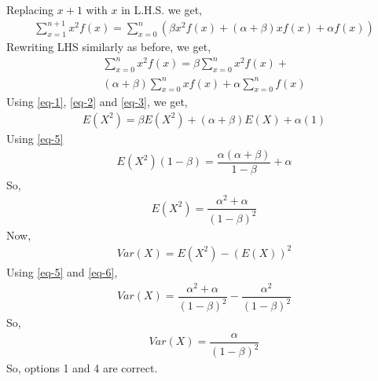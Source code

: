 \documentclass[journal,12pt,twocolumn]{IEEEtran}
\begin{document}
Replacing $x+1$ with $x$ in L.H.S. we get, 
\begin{align}
    \sum_{x=1}^{n+1}x^2f(x)=\sum_{x=0}^n(\beta x^2f(x) + (\alpha+\beta)xf(x) + \alpha f(x))
\end{align}
Rewriting LHS similarly as before, we get,
\begin{align}
    \sum_{x=0}^nx^2f(x)=\beta \sum_{x=0}^nx^2f(x) + \nonumber \\
    (\alpha + \beta)\sum_{x=0}^nxf(x) + \alpha \sum_{x=0}^nf(x)
\end{align}
Using \eqref{eq-1}, \eqref{eq-2} and \eqref{eq-3}, we get,
\begin{align}
    E(X^2)=\beta E(X^2) + (\alpha + \beta)E(X) + \alpha (1) 
\end{align}
Using \eqref{eq-5}
\begin{align}
    E(X^2)(1-\beta)=\dfrac{\alpha(\alpha+\beta)}{1-\beta} + \alpha
\end{align}
So,
\begin{align} \label{eq-6}
    E(X^2)=\dfrac{\alpha^2+\alpha}{(1-\beta)^2}
\end{align}
Now,
\begin{align}
    Var(X)=E(X^2)-(E(X))^2
\end{align}
Using \eqref{eq-5} and \eqref{eq-6},
\begin{align}
    Var(X)=\dfrac{\alpha^2+\alpha}{(1-\beta)^2}-\dfrac{\alpha^2}{(1-\beta)^2}
\end{align}
So,
\begin{align}
    Var(X)=\dfrac{\alpha}{(1-\beta)^2}
\end{align}
So, options 1 and 4 are correct.
\end{document}
